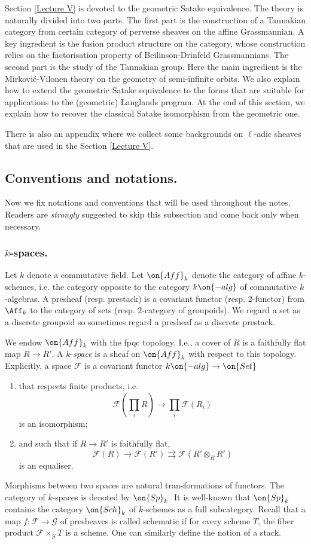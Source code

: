 \documentclass[]{pcmi}
\theoremstyle{plain}
\theoremstyle{remark}
\theoremstyle{definition}
\newcommand{\mF}{{\mathcal F}}
\newcommand{\mG}{{\mathcal G}}
\begin{document}
Section \ref{Lecture V} is devoted to the geometric Satake equivalence. The theory is naturally divided into two parts. The first part is the construction of a Tannakian category from certain category of perverse sheaves on the affine Grassmannian. A key ingredient is the fusion product structure on the category, whose construction relies on the factorisation property of Beilinson-Drinfeld Grassmannians. The second part is the study of the Tannakian group. Here the main ingredient is the Mirkovi\'c-Vilonen theory on the geometry of semi-infinite orbits. We also explain how to extend the geometric Satake equivalence to the forms that are suitable for applications to the (geometric) Langlands program. At the end of this section, we explain how to recover the classical Satake isomorphism from the geometric one. 

There is also an appendix where we collect some backgrounds on $\ell$-adic sheaves that are used in the Section \ref{Lecture V}.

\subsection{Conventions and notations.}
Now we fix notations and conventions that will be used throughout the notes. Readers are \emph{strongly} suggested to skip this subsection and come back only when necessary.
 
 \subsubsection{$k$-spaces.}\label{Intro:sp}
Let $k$ denote a commutative field. 
Let $\on{Aff}_k$ denote the category of affine $k$-schemes, i.e. the category opposite to the category $k\on{-alg}$ of commutative $k$-algebras. A presheaf (resp. prestack) is a covariant functor (resp. $2$-functor)  from $\Aff_k$ to the category of sets (resp. $2$-category of groupoids). We regard a set as a discrete groupoid so sometimes regard a presheaf as a discrete prestack.

We endow $\on{Aff}_k$ with the fpqc topology. I.e., a cover of $R$ is a faithfully flat map $R\to R'$. A $k$-\emph{space} is a sheaf on $\on{Aff}_k$ with respect to this topology. Explicitly, a space $\mF$ is a covariant functor $k\on{-alg}\to \on{Set}$  
\begin{enumerate}
\item  that respects finite products, i.e.
\[\mF(\prod_i R)\to \prod_i \mF(R_i)\]
is an isomorphism;
\item and such that if $R\to R'$ is faithfully flat, 
\begin{equation}\label{fpqc sheaf}
\mF(R)\to \mF(R')\rightrightarrows\mF(R'\otimes_RR') 
\end{equation}
is an equaliser. 
\end{enumerate}
Morphisms between two spaces are natural transformations of functors. The category of $k$-spaces is denoted by $\on{Sp}_k$. It is well-known that $\on{Sp}_k$ contains the category $\on{Sch}_k$ of $k$-schemes as a full subcategory. Recall that a map $f:\mF\to\mG$ of presheaves is called schematic if for every scheme $T$, the fiber product $\mF\times_{\mG}T$ is a scheme. One can similarly define the notion of a stack. 
\end{document}
